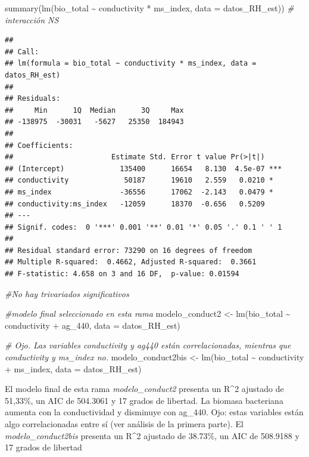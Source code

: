 \documentclass[
]{book}
\newenvironment{Shaded}{\begin{snugshade}}{\end{snugshade}}
\newcommand{\AttributeTok}[1]{\textcolor[rgb]{0.77,0.63,0.00}{#1}}
\newcommand{\CommentTok}[1]{\textcolor[rgb]{0.56,0.35,0.01}{\textit{#1}}}
\newcommand{\FunctionTok}[1]{\textcolor[rgb]{0.00,0.00,0.00}{#1}}
\newcommand{\NormalTok}[1]{#1}
\newcommand{\OtherTok}[1]{\textcolor[rgb]{0.56,0.35,0.01}{#1}}
\newcommand{\SpecialCharTok}[1]{\textcolor[rgb]{0.00,0.00,0.00}{#1}}
\begin{document}
\begin{Shaded}
\begin{Highlighting}[]
\FunctionTok{summary}\NormalTok{(}\FunctionTok{lm}\NormalTok{(bio\_total }\SpecialCharTok{\textasciitilde{}}\NormalTok{ conductivity }\SpecialCharTok{*}\NormalTok{ ms\_index, }\AttributeTok{data =}\NormalTok{ datos\_RH\_est)) }\CommentTok{\# interacción NS}
\end{Highlighting}
\end{Shaded}

\begin{verbatim}
## 
## Call:
## lm(formula = bio_total ~ conductivity * ms_index, data = datos_RH_est)
## 
## Residuals:
##     Min      1Q  Median      3Q     Max 
## -138975  -30031   -5627   25350  184943 
## 
## Coefficients:
##                       Estimate Std. Error t value Pr(>|t|)    
## (Intercept)             135400      16654   8.130  4.5e-07 ***
## conductivity             50187      19610   2.559   0.0210 *  
## ms_index                -36556      17062  -2.143   0.0479 *  
## conductivity:ms_index   -12059      18370  -0.656   0.5209    
## ---
## Signif. codes:  0 '***' 0.001 '**' 0.01 '*' 0.05 '.' 0.1 ' ' 1
## 
## Residual standard error: 73290 on 16 degrees of freedom
## Multiple R-squared:  0.4662, Adjusted R-squared:  0.3661 
## F-statistic: 4.658 on 3 and 16 DF,  p-value: 0.01594
\end{verbatim}

\begin{Shaded}
\begin{Highlighting}[]
\CommentTok{\#No hay trivariados significativos }

\CommentTok{\#modelo final seleccionado en esta rama}
\NormalTok{modelo\_conduct2 }\OtherTok{\textless{}{-}} \FunctionTok{lm}\NormalTok{(bio\_total }\SpecialCharTok{\textasciitilde{}}\NormalTok{ conductivity }\SpecialCharTok{+}\NormalTok{ ag\_440, }\AttributeTok{data =}\NormalTok{ datos\_RH\_est)}

\CommentTok{\# Ojo. Las variables conductivity y ag440 están correlacionadas, mientras que conductivity y ms\_index no.}
\NormalTok{modelo\_conduct2bis }\OtherTok{\textless{}{-}} \FunctionTok{lm}\NormalTok{(bio\_total }\SpecialCharTok{\textasciitilde{}}\NormalTok{ conductivity }\SpecialCharTok{+}\NormalTok{ ms\_index, }\AttributeTok{data =}\NormalTok{ datos\_RH\_est)}
\end{Highlighting}
\end{Shaded}

El modelo final de esta rama \emph{modelo\_conduct2} presenta un R\^{}2 ajustado de 51,33\%, un AIC de 504.3061 y 17 grados de libertad. La biomasa bacteriana aumenta con la conductividad y disminuye con ag\_440. Ojo: estas variables están algo correlacionadas entre sí (ver análisis de la primera parte). El \emph{modelo\_conduct2bis} presenta un R\^{}2 ajustado de 38.73\%, un AIC de 508.9188 y 17 grados de libertad
\end{document}
